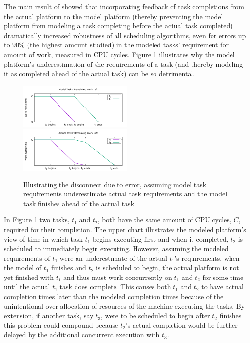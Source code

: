 \documentclass[10pt]{csce}
\begin{document}
The main result of \cite{pdpta18} showed that incorporating feedback of
task completions from the actual platform to the model platform (thereby
preventing the model platform from modeling a task completing before the
actual task completed) dramatically increased robustness of all scheduling
algorithms, even for errors up to 90\% (the highest amount studied) in the
modeled tasks' requirement for amount of work, measured in CPU cycles.  Figure
\ref{fig:underestimating} illustrates why the model platform's underestimation
of the requirements of a task (and thereby modeling it as completed ahead of
the actual task) can be so detrimental.

\begin{figure}
	\begin{center}
		\includegraphics[width=0.5\textwidth]{figures/UnderestimatedErrorEffect_ModelTaskWork.pdf}
		\includegraphics[width=0.5\textwidth]{figures/UnderestimatedErrorEffect_ActualTaskWork.pdf}
	\end{center}
	\caption{Illustrating the disconnect due to error, assuming model task
		requirements underestimate actual task requirements and the model
		task finishes ahead of the actual task.}
	\label{fig:underestimating}
\end{figure}

In Figure \ref{fig:underestimating} two tasks, $t_1$ and $t_2$, both have
the same amount of CPU cycles, $C$, required for their completion.  The upper
chart illustrates the modeled platform's view of time in which task $t_1$ begins
executing first and when it completed, $t_2$ is scheduled to immediately
begin executing.  However, assuming the modeled requirements of $t_1$ were
an underestimate of the actual $t_1$'s requirements, when the model of
$t_1$ finishes and $t_2$ is scheduled to begin, the actual platform is not
yet finished with $t_1$ and thus must work concurrently on $t_1$ and $t_2$
for some time until the actual $t_1$ task does complete.  This causes both
$t_1$ and $t_2$ to have actual completion times later than the modeled
completion times because of the unintentional over allocation of resources of
the machine executing the tasks.  By extension, if another task, say $t_3$,
were to be scheduled to begin after $t_2$ finishes this problem could compound
because $t_2$'s actual completion would be further delayed by the additional
concurrent execution with $t_3$.
\end{document}
